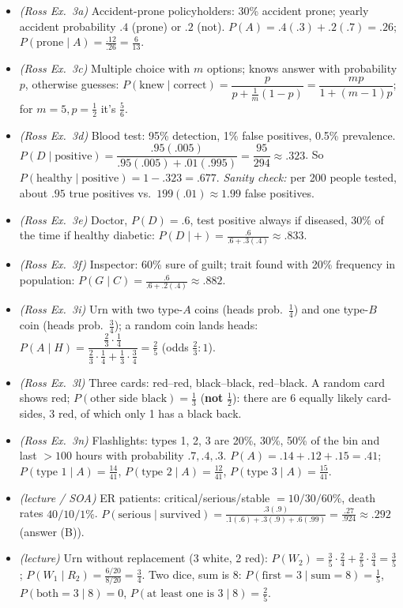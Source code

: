 \documentclass[11pt]{article}
\begin{document}
\begin{exbox}[Examples]
\begin{itemize}
\item \emph{(Ross Ex.\ 3a)} Accident-prone policyholders: 30\% accident prone; yearly accident probability $.4$ (prone) or $.2$ (not). $P(A)=.4(.3)+.2(.7)=.26$; $P(\text{prone}\mid A)=\frac{.12}{.26}=\frac6{13}$.
\item \emph{(Ross Ex.\ 3c)} Multiple choice with $m$ options; knows answer with probability $p$, otherwise guesses: $P(\text{knew}\mid\text{correct})=\dfrac{p}{p+\frac1m(1-p)}=\dfrac{mp}{1+(m-1)p}$; for $m=5,p=\frac12$ it's $\frac56$.
\item \emph{(Ross Ex.\ 3d)} Blood test: 95\% detection, 1\% false positives, 0.5\% prevalence. $P(D\mid\text{positive})=\dfrac{.95(.005)}{.95(.005)+.01(.995)}=\dfrac{95}{294}\approx.323$. So $P(\text{healthy}\mid\text{positive})=1-.323=.677$. \emph{Sanity check:} per 200 people tested, about $.95$ true positives vs.\ $199(.01)\approx1.99$ false positives.
\item \emph{(Ross Ex.\ 3e)} Doctor, $P(D)=.6$, test positive always if diseased, $30\%$ of the time if healthy diabetic: $P(D\mid +)=\frac{.6}{.6+.3(.4)}\approx.833$.
\item \emph{(Ross Ex.\ 3f)} Inspector: 60\% sure of guilt; trait found with 20\% frequency in population: $P(G\mid C)=\frac{.6}{.6+.2(.4)}\approx.882$.
\item \emph{(Ross Ex.\ 3i)} Urn with two type-$A$ coins (heads prob.\ $\frac14$) and one type-$B$ coin (heads prob.\ $\frac34$); a random coin lands heads: $P(A\mid H)=\dfrac{\frac23\cdot\frac14}{\frac23\cdot\frac14+\frac13\cdot\frac34}=\frac25$ (odds $\frac23:1$).
\item \emph{(Ross Ex.\ 3l)} Three cards: red--red, black--black, red--black. A random card shows red; $P(\text{other side black})=\frac13$ (\textbf{not} $\frac12$): there are 6 equally likely card-sides, 3 red, of which only 1 has a black back.
\item \emph{(Ross Ex.\ 3n)} Flashlights: types 1, 2, 3 are 20\%, 30\%, 50\% of the bin and last $>100$ hours with probability $.7,.4,.3$. $P(A)=.14+.12+.15=.41$; $P(\text{type }1\mid A)=\frac{14}{41}$, $P(\text{type }2\mid A)=\frac{12}{41}$, $P(\text{type }3\mid A)=\frac{15}{41}$.
\item \emph{(lecture / SOA)} ER patients: critical/serious/stable $=10/30/60\%$, death rates $40/10/1\%$. $P(\text{serious}\mid\text{survived})=\frac{.3(.9)}{.1(.6)+.3(.9)+.6(.99)}=\frac{.27}{.924}\approx.292$ (answer (B)).
\item \emph{(lecture)} Urn without replacement (3 white, 2 red): $P(W_2)=\frac35\cdot\frac24+\frac25\cdot\frac34=\frac35$; $P(W_1\mid R_2)=\frac{6/20}{8/20}=\frac34$. Two dice, sum is 8: $P(\text{first}=3\mid\text{sum}=8)=\frac15$, $P(\text{both}=3\mid8)=0$, $P(\text{at least one is }3\mid 8)=\frac25$.
\end{itemize}
\end{exbox}
\end{document}
